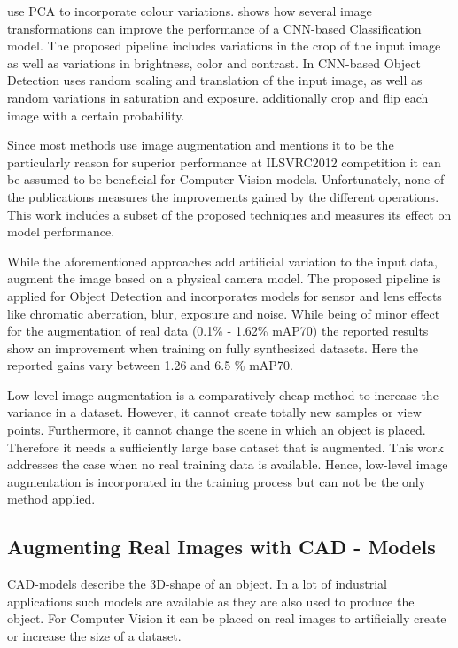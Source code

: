 \citeauthor{Krizhevsky2012a} \cite{Krizhevsky2012a} use \ac{PCA} to incorporate colour variations. \citeauthor{Howard2013} \cite{Howard2013} shows how several image transformations can improve the performance of a \ac{CNN}-based Classification model. The proposed pipeline includes variations in the crop of the input image as well as variations in brightness, color and contrast. In \ac{CNN}-based Object Detection \citeauthor{Redmon} \cite{Redmon} uses random scaling and translation of the input image, as well as random variations in saturation and exposure. \citeauthor{Liu} \cite{Liu} additionally crop and flip each image with a certain probability.

Since most methods use image augmentation and \citeauthor{Krizhevsky2012a} \cite{Krizhevsky2012a} mentions it to be the particularly reason for superior performance at ILSVRC2012 competition it can be assumed to be beneficial for Computer Vision models. Unfortunately, none of the publications measures the improvements gained by the different operations. This work includes a subset of the proposed techniques and measures its effect on model performance.

While the aforementioned approaches add artificial variation to the input data, \citeauthor{Carlson2018}\cite{Carlson2018} augment the image based on a physical camera model. The proposed pipeline is applied for Object Detection and incorporates models for sensor and lens effects like chromatic aberration, blur, exposure and noise. While being of minor effect for the augmentation of real data (0.1\% - 1.62\% \ac{mAP}70) the reported results show an improvement when training on fully synthesized datasets. Here the reported gains vary between 1.26 and 6.5 \% \ac{mAP}70.

Low-level image augmentation is a comparatively cheap method to increase the variance in a dataset. However, it cannot create totally new samples or view points. Furthermore, it cannot change the scene in which an object is placed. Therefore it needs a sufficiently large base dataset that is augmented. This work addresses the case when no real training data is available. Hence, low-level image augmentation is incorporated in the training process but can not be the only method applied.

\subsection{Augmenting Real Images with CAD - Models}

\ac{CAD}-models describe the 3D-shape of an object. In a lot of industrial applications such models are available as they are also used to produce the object. For Computer Vision it can be placed on real images to artificially create or increase the size of a dataset. 

